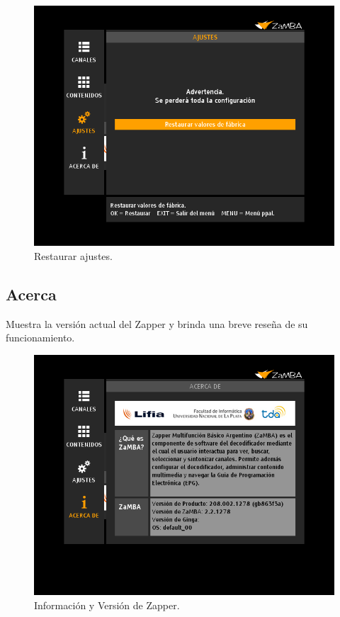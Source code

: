 \documentclass{article}
\begin{document}
	\begin{figure}[h]
		\centerline{\includegraphics[scale=0.50,keepaspectratio=true]{ajustes_restaurar}}
 		\caption{Restaurar ajustes.}
	\end{figure}
	
\pagebreak

\subsection{Acerca} Muestra la versión actual del Zapper y brinda una breve reseña de su funcionamiento.

\begin{figure}[h]
 \centerline{\includegraphics[scale=0.50,keepaspectratio=true]{acerca}}
 \caption{Información y Versión de Zapper.}
\end{figure}
\end{document}
